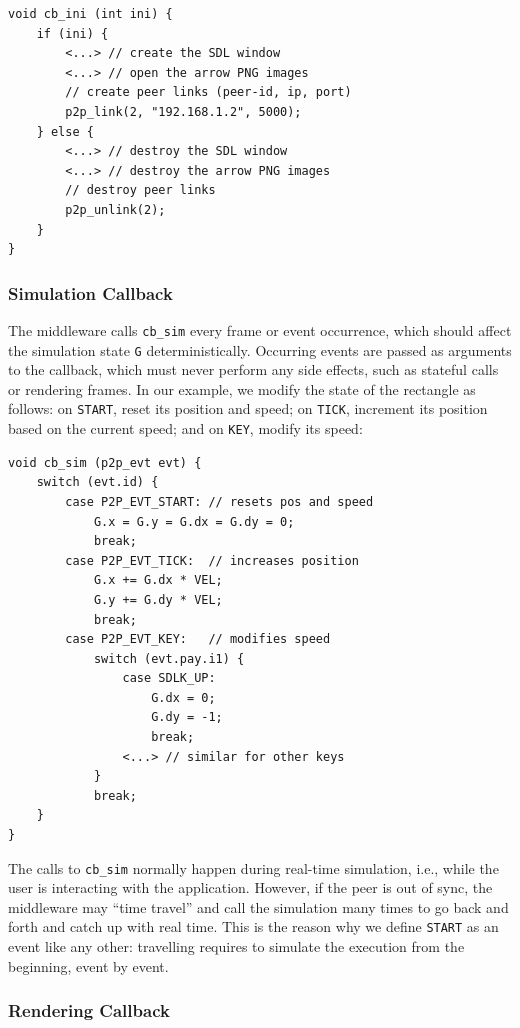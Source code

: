 \documentclass[12pt]{article}
\newcommand{\code}[1]  {\texttt{\small{#1}}}
\begin{document}
{\footnotesize
\begin{verbatim}
void cb_ini (int ini) {
    if (ini) {
        <...> // create the SDL window
        <...> // open the arrow PNG images
        // create peer links (peer-id, ip, port)
        p2p_link(2, "192.168.1.2", 5000);
    } else {
        <...> // destroy the SDL window
        <...> // destroy the arrow PNG images
        // destroy peer links
        p2p_unlink(2);
    }
}
\end{verbatim}
}

\subsubsection{Simulation Callback}
\label{sec.tml.api.cb_sim}

The middleware calls \code{cb\_sim} every frame or event occurrence, which
should affect the simulation state \code{G} deterministically.
Occurring events are passed as arguments to the callback, which must never
perform any side effects, such as stateful calls or rendering frames.
In our example, we modify the state of the rectangle as follows:
    on \code{START}, reset its position and speed;
    on \code{TICK},  increment its position based on the current speed; and
    on \code{KEY},   modify its speed:

{\footnotesize
\begin{verbatim}
void cb_sim (p2p_evt evt) {
    switch (evt.id) {
        case P2P_EVT_START: // resets pos and speed
            G.x = G.y = G.dx = G.dy = 0;
            break;
        case P2P_EVT_TICK:  // increases position
            G.x += G.dx * VEL;
            G.y += G.dy * VEL;
            break;
        case P2P_EVT_KEY:   // modifies speed
            switch (evt.pay.i1) {
                case SDLK_UP:
                    G.dx = 0;
                    G.dy = -1;
                    break;
                <...> // similar for other keys
            }
            break;
    }
}
\end{verbatim}
}

The calls to \code{cb\_sim} normally happen during real-time simulation, i.e.,
while the user is interacting with the application.
However, if the peer is out of sync, the middleware may ``time travel'' and
call the simulation many times to go back and forth and catch up with real
time.
This is the reason why we define \code{START} as an event like any other:
travelling requires to simulate the execution from the beginning, event by
event.

\subsubsection{Rendering Callback}
\label{sec.tml.api.cb_ren}
\end{document}
